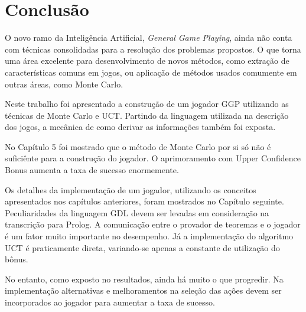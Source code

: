 \chapter{Conclusão}
O novo ramo da Inteligência Artificial, \textit{General Game Playing}, ainda não conta com técnicas consolidadas para a resolução dos problemas propostos. O que torna uma área excelente para desenvolvimento de novos métodos, como extração de características comuns em jogos, ou aplicação de métodos usados comumente em outras áreas, como Monte Carlo.

Neste trabalho foi apresentado a construção de um jogador GGP utilizando as técnicas de Monte Carlo e UCT. Partindo da linguagem utilizada na descrição dos jogos, a mecânica de como derivar as informações também foi exposta. 

No Capítulo 5 foi mostrado que o método de Monte Carlo por si só não é suficiênte para a construção do jogador. O aprimoramento com Upper Confidence Bonus aumenta a taxa de sucesso enormemente. 

Os detalhes da implementação de um jogador, utilizando os conceitos apresentados nos capítulos anteriores, foram mostrados no Capítulo seguinte. Peculiaridades da linguagem GDL devem ser levadas em consideração na transcrição para Prolog. A comunicação entre o provador de teoremas e o jogador é um fator muito importante no desempenho. Já a implementação do algoritmo UCT é praticamente direta, variando-se apenas a constante de utilização do bônus.

No entanto, como exposto no resultados, ainda há muito o que progredir. Na implementação alternativas e melhoramentos na seleção das ações devem ser incorporados ao jogador para aumentar a taxa de sucesso.